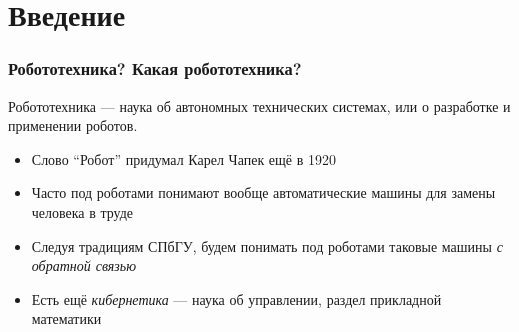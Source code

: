 \documentclass{../../slides-style}
\begin{document}
    \section{Введение}

    \begin{frame}
        \frametitle{Робототехника? Какая робототехника?}
        Робототехника --- наука об автономных технических системах, или о разработке и применении роботов.
        \begin{itemize}
            \item Слово \enquote{Робот} придумал Карел Чапек ещё в 1920
            \item Часто под роботами понимают вообще автоматические машины для замены человека в труде
            \item Следуя традициям СПбГУ, будем понимать под роботами таковые машины \emph{с обратной связью}
            \item Есть ещё \emph{кибернетика} --- наука об управлении, раздел прикладной математики
        \end{itemize}
    \end{frame}
\end{document}
